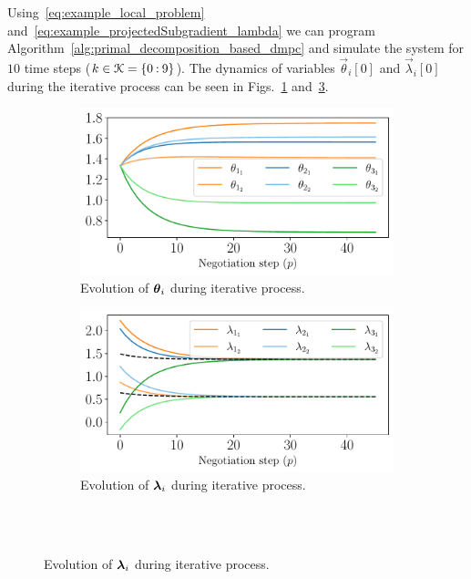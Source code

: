 \documentclass[../main.tex]{subfiles}
\begin{document}
Using~\eqref{eq:example_local_problem} and~\eqref{eq:example_projectedSubgradient_lambda}
we can program Algorithm~\ref{alg:primal_decomposition_based_dmpc} and simulate the system for $10$ time steps (${k\in\mathcal{K}=\{0\mathbin{:}9\}}$).
The dynamics of variables $\vec{\theta}_{i}[0]$ and $\vec{\lambda}_{i}[0]$ during the iterative process can be seen in Figs.~\ref{fig:example_theta} and~\ref{fig:example_lambda}.

\begin{figure}[h]
  \centering
  \begin{subfigure}{0.45\textwidth}
    \includegraphics[width=\textwidth]{../img/example_primal_decomposition/example_theta.pdf}
    \caption{Evolution of $\boldsymbol{\theta}_i$ during iterative process.}\label{fig:example_theta}
  \end{subfigure}
  \hfill
  \begin{subfigure}{0.45\textwidth}
    \centering
    \includegraphics[width=\textwidth]{../img/example_primal_decomposition/example_lambda.pdf}
    \caption{Evolution of $\boldsymbol{\lambda}_i$ during iterative process.}\label{fig:example_lambda}
  \end{subfigure}
  \\~\\

\end{figure}
\end{document}
